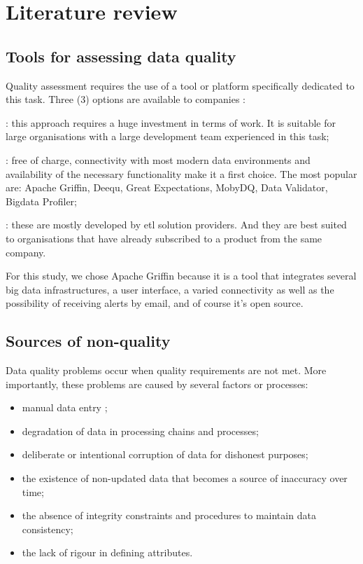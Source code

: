 \section{Literature review }

\subsection{Tools for assessing data quality}
Quality assessment requires the use of a tool or platform specifically dedicated to this task. Three (3) options are available to companies \cite{linkedinDeepakRout}:
\begin{description}[parsep=0cm,itemsep=0cm]
\item[a home-made tool] : this approach requires a huge investment in terms of work. It is suitable for large organisations with a large development team experienced in this task;
\item[an open source tool]: free of charge, connectivity with most modern data environments and availability of the necessary functionality make it a first choice. The most popular are: Apache Griffin, Deequ, Great Expectations, MobyDQ, Data Validator, Bigdata Profiler;
\item[a commercial solution]: these are mostly developed by \acrfull{etl} solution providers. And they are best suited to organisations that have already subscribed to a product from the same company.
\end{description}
For this study, we chose Apache Griffin because it is a tool that integrates several big data infrastructures, a user interface, a varied connectivity as well as the possibility of receiving alerts by email, and of course it's open source.

\subsection{Sources of non-quality}
Data quality problems occur when quality requirements are not met.
More importantly, these problems are caused by several factors or processes:
\begin{itemize}[parsep=0cm,itemsep=0cm]
\item manual data entry ;
\item degradation of data in processing chains and processes;
\item deliberate or intentional corruption of data for dishonest purposes;
\item the existence of non-updated data that becomes a source of inaccuracy over time;
\item the absence of integrity constraints and procedures to maintain data consistency;
\item the lack of rigour in defining attributes.
\end{itemize}

